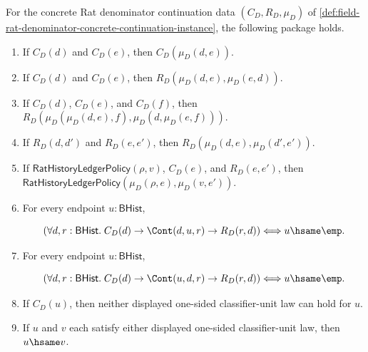 \begin{theorem}
\label{thm:field-rat-denominator-concrete-external-unit-package}
For the concrete Rat denominator continuation data
$(C_D,R_D,\mu_D)$ of
\autoref{def:field-rat-denominator-concrete-continuation-instance}, the
following package holds.
\begin{enumerate}
  \item If $C_D(d)$ and $C_D(e)$, then $C_D(\mu_D(d,e))$.
  \item If $C_D(d)$ and $C_D(e)$, then
  $R_D(\mu_D(d,e),\mu_D(e,d))$.
  \item If $C_D(d)$, $C_D(e)$, and $C_D(f)$, then
  $R_D(\mu_D(\mu_D(d,e),f),\mu_D(d,\mu_D(e,f)))$.
  \item If $R_D(d,d')$ and $R_D(e,e')$, then
  $R_D(\mu_D(d,e),\mu_D(d',e'))$.
  \item If $\mathsf{RatHistoryLedgerPolicy}(\rho,v)$, $C_D(e)$, and
  $R_D(e,e')$, then
  $\mathsf{RatHistoryLedgerPolicy}(\mu_D(\rho,e),\mu_D(v,e'))$.
  \item For every endpoint $u:\mathsf{BHist}$,

  $$
  \left(
  \forall d,r:\mathsf{BHist}.\;
  C_D(d)\to
  \Cont(d,u,r)\to
  R_D(r,d)
  \right)
  \Longleftrightarrow
  u\hsame\emp.
  $$

  \item For every endpoint $u:\mathsf{BHist}$,

  $$
  \left(
  \forall d,r:\mathsf{BHist}.\;
  C_D(d)\to
  \Cont(u,d,r)\to
  R_D(r,d)
  \right)
  \Longleftrightarrow
  u\hsame\emp.
  $$

  \item If $C_D(u)$, then neither displayed one-sided classifier-unit law can
  hold for $u$.
  \item If $u$ and $v$ each satisfy either displayed one-sided classifier-unit
  law, then $u\hsame v$.
\end{enumerate}
\end{theorem}
